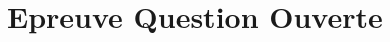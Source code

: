 \documentclass[11pt]{scrreprt}
\begin{document}
    \section{Epreuve Question Ouverte}
    \begin{figure}[H]
        \centering
        \mbox{\quad\quad\quad
}
\end{figure}
\end{document}
